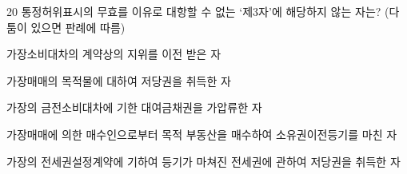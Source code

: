 \begin{question}{20}
통정허위표시의 무효를 이유로 대항할 수 없는 ‘제3자’에 해당하지 않는 자는? (다툼이 있으면 판례에 따름)
\begin{choices}
  \item 가장소비대차의 계약상의 지위를 이전 받은 자
  \item 가장매매의 목적물에 대하여 저당권을 취득한 자
  \item 가장의 금전소비대차에 기한 대여금채권을 가압류한 자
  \item 가장매매에 의한 매수인으로부터 목적 부동산을 매수하여 소유권이전등기를 마친 자
  \item 가장의 전세권설정계약에 기하여 등기가 마쳐진 전세권에 관하여 저당권을 취득한 자
\end{choices}
\end{question}
